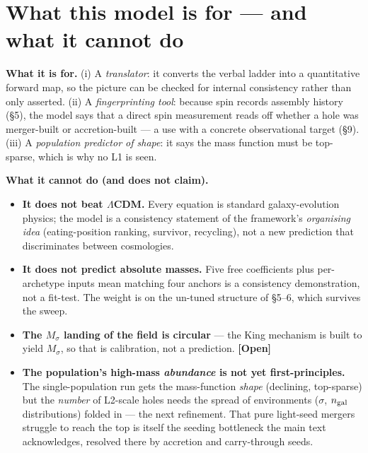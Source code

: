 \documentclass[11pt]{article}
\newcommand{\Open}{\textbf{\textcolor{gray!10!black}{[Open]}}}
\newcommand{\Msig}{M_\sigma}
\begin{document}
\section{What this model is for --- and what it cannot do}
\textbf{What it is for.} (i) A \emph{translator}: it converts the verbal ladder into a quantitative forward map, so the picture can be checked for internal consistency rather than only asserted. (ii) A \emph{fingerprinting tool}: because spin records assembly history (\S5), the model says that a direct spin measurement reads off whether a hole was merger-built or accretion-built --- a use with a concrete observational target (\S9). (iii) A \emph{population predictor of shape}: it says the mass function must be top-sparse, which is why no L1 is seen.

\textbf{What it cannot do (and does not claim).}
\begin{itemize}[leftmargin=1.3em,itemsep=2pt]
\item \textbf{It does not beat $\Lambda$CDM.} Every equation is standard galaxy-evolution physics; the model is a consistency statement of the framework's \emph{organising idea} (eating-position ranking, survivor, recycling), not a new prediction that discriminates between cosmologies.
\item \textbf{It does not predict absolute masses.} Five free coefficients plus per-archetype inputs mean matching four anchors is a consistency demonstration, not a fit-test. The weight is on the un-tuned structure of \S5--6, which survives the sweep.
\item \textbf{The $\Msig$ landing of the field is circular} --- the King mechanism is built to yield $\Msig$, so that is calibration, not a prediction. \Open
\item \textbf{The population's high-mass \emph{abundance} is not yet first-principles.} The single-population run gets the mass-function \emph{shape} (declining, top-sparse) but the \emph{number} of L2-scale holes needs the spread of environments ($\sigma$, $n_{\rm gal}$ distributions) folded in --- the next refinement. That pure light-seed mergers struggle to reach the top is itself the seeding bottleneck the main text acknowledges, resolved there by accretion and carry-through seeds.
\end{itemize}

\end{document}
